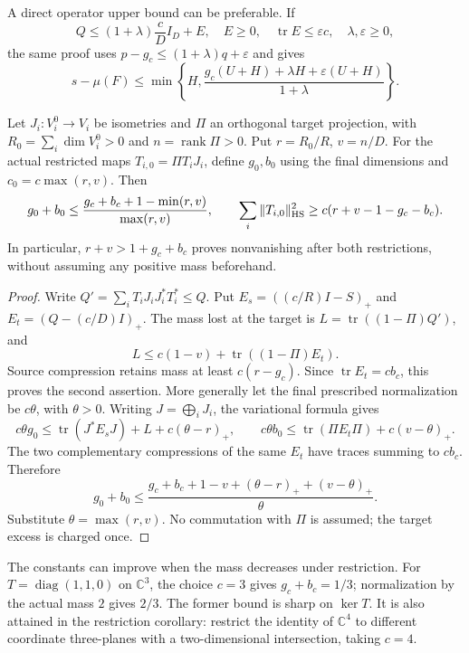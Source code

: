 A direct operator upper bound can be preferable. If
\[
 Q\le(1+\lambda)\frac cD I_D+E,\quad E\ge0,\quad
 \operatorname{tr}E\le\varepsilon c,\quad \lambda,\varepsilon\ge0,
\]
the same proof uses \(p-g_c\le(1+\lambda)q+\varepsilon\) and gives
\[
 s-\mu(F)\le
 \min\left\{H,
 \frac{g_c(U+H)+\lambda H+\varepsilon(U+H)}{1+\lambda}\right\}.
\]

\begin{corollary}
\label{shared-prescribed-restrictions}
Let \(J_i:V_i^0\to V_i\) be isometries and \(\Pi\) an orthogonal
target projection, with \(R_0=\sum_i\dim V_i^0>0\) and
\(n=\operatorname{rank}\Pi>0\). Put \(r=R_0/R\), \(v=n/D\).
For the actual restricted maps \(T_{i,0}=\Pi T_iJ_i\), define
\(g_0,b_0\) using the final dimensions and
\(c_0=c\max(r,v)\). Then
\begin{equation}\label{shared-prescribed-restriction-bound}
 g_0+b_0\le\frac{g_c+b_c+1-\min(r,v)}{\max(r,v)},\qquad
 \sum_i\|T_{i,0}\|_{\rm HS}^2
 \ge c(r+v-1-g_c-b_c).
\end{equation}
In particular, \(r+v>1+g_c+b_c\) proves nonvanishing after both
restrictions, without assuming any positive mass beforehand.
\end{corollary}

\begin{proof}
Write \(Q'=\sum_iT_iJ_iJ_i^*T_i^*\le Q\).
Put \(E_s=((c/R)I-S)_+\) and \(E_t=(Q-(c/D)I)_+\).
The mass lost at the target is
\(L=\operatorname{tr}((1-\Pi)Q')\), and
\[
 L\le c(1-v)+\operatorname{tr}((1-\Pi)E_t).
\]
Source compression retains mass at least \(c(r-g_c)\).
Since \(\operatorname{tr}E_t=cb_c\), this proves the
second assertion. More generally let the final prescribed
normalization be \(c\theta\), with \(\theta>0\).
Writing \(J=\bigoplus_iJ_i\), the variational formula gives
\[
 c\theta g_0\le\operatorname{tr}(J^*E_sJ)+L
                                      +c(\theta-r)_+,
 \qquad
 c\theta b_0\le\operatorname{tr}(\Pi E_t\Pi)
                                      +c(v-\theta)_+.
\]
The two complementary compressions of the same \(E_t\)
have traces summing to \(cb_c\). Therefore
\begin{equation}\label{shared-prescribed-restriction-theta}
 g_0+b_0\le
 \frac{g_c+b_c+1-v+(\theta-r)_++(v-\theta)_+}{\theta}.
\end{equation}
Substitute \(\theta=\max(r,v)\). No commutation with
\(\Pi\) is assumed; the target excess is charged once.
\end{proof}

The constants can improve when the mass decreases under restriction.
For \(T=\operatorname{diag}(1,1,0)\) on \(\mathbb C^3\), the
choice \(c=3\) gives \(g_c+b_c=1/3\); normalization by the actual
mass \(2\) gives \(2/3\). The former bound is sharp on \(\ker T\).
It is also attained in the restriction corollary: restrict the identity
of \(\mathbb C^4\) to different coordinate three-planes with a
two-dimensional intersection, taking \(c=4\).

